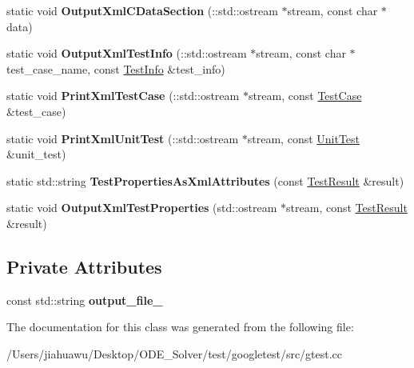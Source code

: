 \begin{DoxyCompactItemize}
\item 
\mbox{\label{classtesting_1_1internal_1_1_xml_unit_test_result_printer_a41bccd75f54932c5b3b8cce1f94dbd54}} 
static void {\bfseries Output\+Xml\+C\+Data\+Section} (\+::std\+::ostream $\ast$stream, const char $\ast$data)
\item 
\mbox{\label{classtesting_1_1internal_1_1_xml_unit_test_result_printer_af642843faed4cd28c77d688f6f2820d7}} 
static void {\bfseries Output\+Xml\+Test\+Info} (\+::std\+::ostream $\ast$stream, const char $\ast$test\+\_\+case\+\_\+name, const \mbox{\hyperlink{classtesting_1_1_test_info}{Test\+Info}} \&test\+\_\+info)
\item 
\mbox{\label{classtesting_1_1internal_1_1_xml_unit_test_result_printer_a7f7accabeac896d4271f36d24ca02dba}} 
static void {\bfseries Print\+Xml\+Test\+Case} (\+::std\+::ostream $\ast$stream, const \mbox{\hyperlink{classtesting_1_1_test_case}{Test\+Case}} \&test\+\_\+case)
\item 
\mbox{\label{classtesting_1_1internal_1_1_xml_unit_test_result_printer_a3be1c8766241d0f34cdf59b45a52f73b}} 
static void {\bfseries Print\+Xml\+Unit\+Test} (\+::std\+::ostream $\ast$stream, const \mbox{\hyperlink{classtesting_1_1_unit_test}{Unit\+Test}} \&unit\+\_\+test)
\item 
\mbox{\label{classtesting_1_1internal_1_1_xml_unit_test_result_printer_aaac4f1352a2cc46f6a69994d45999f0b}} 
static std\+::string {\bfseries Test\+Properties\+As\+Xml\+Attributes} (const \mbox{\hyperlink{classtesting_1_1_test_result}{Test\+Result}} \&result)
\item 
\mbox{\label{classtesting_1_1internal_1_1_xml_unit_test_result_printer_a69b5b7ac1b8236760790768be5ebb218}} 
static void {\bfseries Output\+Xml\+Test\+Properties} (std\+::ostream $\ast$stream, const \mbox{\hyperlink{classtesting_1_1_test_result}{Test\+Result}} \&result)
\end{DoxyCompactItemize}
\subsection*{Private Attributes}
\begin{DoxyCompactItemize}
\item 
\mbox{\label{classtesting_1_1internal_1_1_xml_unit_test_result_printer_aa81cc4540d16279f5eb5f7ec9f366ea7}} 
const std\+::string {\bfseries output\+\_\+file\+\_\+}
\end{DoxyCompactItemize}


The documentation for this class was generated from the following file\+:\begin{DoxyCompactItemize}
\item 
/\+Users/jiahuawu/\+Desktop/\+O\+D\+E\+\_\+\+Solver/test/googletest/src/gtest.\+cc\end{DoxyCompactItemize}
